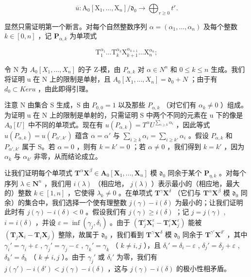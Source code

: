 \[
\overline {{u}}: \mathrm{A} _ {0} [ \mathrm{X} _ {1}, \dots , \mathrm{X} _ {n} ] / \mathfrak {d} _ {0} \rightarrow \bigoplus_ {r \geqslant 0} t ^ {r}.
\]

显然只需证明第一个断言。对每个自然整数序列 \(\alpha = (\alpha_{1},\ldots,\alpha_{n})\) 及每个整数 \(k\in[0,n]\) ，记 \(\mathbf{P}_{\alpha,k}\) 为单项式

\[
\mathrm{T} _ {1} ^ {\alpha_ {1}} \dots \mathrm{T} _ {k} ^ {\alpha_ {k}} \mathrm{X} _ {k + 1} ^ {\alpha_ {k + 1}} \dots \mathrm{X} _ {n} ^ {\alpha_ {n}};
\]

令 N 为 \(A_{0}[X_{1}, \ldots, X_{n}]\) 的子 Z-模，由 \(P_{\alpha,k}\) 对 \(\alpha \in N^{n}\) 和 \(0 \leqslant k \leqslant n\) 生成。我们将证明 u 在 N 上的限制是单射，且 \(A_{0}[X_{1}, \ldots, X_{n}] = \mathfrak{d}_{0} + N\) ；由于有 \(d_{0} \subset Ker u\) ，由此即得引理。

注意 N 由集合 S 生成，S 由 \(P_{0,0} = 1\) 以及那些 \(P_{\alpha,k}\) （对它们有 \(\alpha_k \neq 0\) ）组成。为证明 u 在 N 上的限制是单射的，只需证明 S 中两个不同的元素在 u 下的像是 \(A_0[U]\) 中不同的单项式。现在有 \(u(P_{\alpha,k}) = T^\alpha U^{\sum_{i \geq k} \alpha_i}\) ，因此等式 \(u(P_{\alpha,k}) = u(P_{\alpha',k'})\) 蕴含 \(\alpha = \alpha'\) 与 \(\sum_{i \geq k} \alpha_i = \sum_{i \geq k'} \alpha_i\) 。假设 \(P_{\alpha,k}\) 和 \(P_{\alpha',k'}\) 属于 S。若 \(\alpha = 0\) ，则有 \(k = k' = 0\) ；若 \(\alpha \neq 0\) ，我们得到 \(k = k'\) ，因为 \(\alpha_k\) 与 \(\alpha_{k'}\) 非零，从而结论成立。

让我们证明每个单项式 \(\mathbf{T}^{\alpha}\mathbf{X}^{\beta}\in\mathbf{A}_{0}[\mathbf{X}_{1},..., \mathbf{X}_{n}]\) 模 \(\mathfrak{d}_{0}\) 同余于某个 \(\mathbf{P}_{\eta,k}\) 。对每个序列 \(\lambda\in\mathbf{N}^{n}\) ，我们用 \(i(\lambda)\) （相应地， \(j(\lambda)\) ）表示最小的（相应地，最大的）整数 \(k\in[1,n]\) ，它使得 \(\lambda_{k}\neq0\) 。在单项式 \(\mathbf{T}^{\gamma}\mathbf{X}^{\delta}\) （它们与 \(\mathbf{T}^{\alpha}\mathbf{X}^{\beta}\) 模 \(\mathfrak{d}_{0}\) 同余）的集合中，我们选择一个使有理整数 \(j(\gamma)-i(\delta)\) 为最小的；让我们证明此时有 \(j(\gamma)-i(\delta)<0\) 。假设我们有 \(j(\gamma)\geqslant i(\delta)\) ；记 \(j=j(\gamma)\) , \(i=i(\delta)\) ，并设 \(\varepsilon=\inf(\gamma_{j},\delta_{i})\) 。由于 \((\mathbf{T}_{j}^{\varepsilon}\mathbf{X}_{i}^{\varepsilon}-\mathbf{T}_{i}^{\varepsilon}\mathbf{X}_{j}^{\varepsilon})\) 能被 \((\mathbf{T}_{j}\mathbf{X}_{i}-\mathbf{T}_{i}\mathbf{X}_{j})\) 整除，故属于 \(\mathfrak{d}_{0}\) ，我们看到 \(\mathbf{T}^{\gamma}\mathbf{X}^{\delta}\) 模 \(\mathfrak{d}_{0}\) 同余于 \(\mathbf{T}^{\gamma'}\mathbf{X}^{\delta'}\) ，其中 \(\gamma_{i}'=\gamma_{i}+\varepsilon\) , \(\gamma_{j}'=\gamma_{j}-\varepsilon\) , \(\gamma_{k}'=\gamma_{k}\) （ \(k\neq i,j\) ），且 \(\delta_{i}'=\delta_{i}-\varepsilon\) , \(\delta_{j}'=\delta_{j}+\varepsilon\) , \(\delta_{k}'=\delta_{k}\) （ \(k\neq i,j\) ）。由于 \(\gamma_{j}'\) 或 \(\delta_{i}'\) 为零，我们有 \(j(\gamma')-i(\delta')<j(\gamma)-i(\delta)\) ，这与 \(j(\gamma)-i(\delta)\) 的极小性相矛盾。

